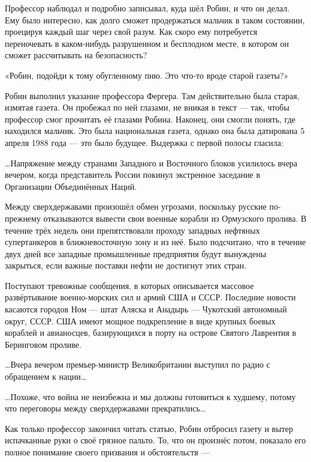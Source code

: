 \documentclass[a4paper,12pt]{book}
\begin{document}
\par
Профессор наблюдал и подробно записывал, куда шёл Робин, и что он делал. Ему было интересно, как долго сможет продержаться мальчик в таком состоянии, проецируя каждый шаг через свой разум. Как скоро ему потребуется переночевать в каком-нибудь разрушенном и бесплодном месте, в котором он сможет рассчитывать на безопасность?
\par
«Робин, подойди к тому обугленному пню. Это что-то вроде старой газеты?»
\par
Робин выполнил указание профессора Фергера. Там действительно была старая, измятая газета. Он пробежал по ней глазами, не вникая в текст — так, чтобы профессор смог прочитать её глазами Робина. Наконец, они смогли понять, где находился мальчик. Это была национальная газета, однако она была датирована 5 апреля 1988 года — это было будущее. Выдержка с первой полосы гласила:\\
\par
…Напряжение между странами Западного и Восточного блоков усилилось вчера вечером, когда представитель России покинул экстренное заседание в Организации Объединённых Наций.
\par
Между сверхдержавами произошёл обмен угрозами, поскольку русские по-прежнему отказываются вывести свои военные корабли из Ормузского пролива. В течение трёх недель они препятствовали проходу западных нефтяных супертанкеров в ближневосточную зону и из неё. Было подсчитано, что в течение двух дней все западные промышленные предприятия будут вынуждены закрыться, если важные поставки нефти не достигнут этих стран.
\par
Поступают тревожные сообщения, в которых описывается массовое развёртывание военно-морских сил и армий США и СССР. Последние новости касаются городов Ном — штат Аляска и Анадырь — Чукотский автономный округ, СССР. США имеют мощное подкрепление в виде крупных боевых кораблей и авианосцев, базирующихся в порту на острове Святого Лаврентия в Беринговом проливе.\\
\par
…Вчера вечером премьер-министр Великобритании выступил по радио с обращением к нации…\\
\par
…Похоже, что война не неизбежна и мы должны готовиться к худшему, потому что переговоры между сверхдержавами прекратились…\\
\par
Как только профессор закончил читать статью, Робин отбросил газету и вытер испачканные руки о своё грязное пальто. То, что он произнёс потом, показало его полное понимание своего призвания и обстоятельств —
\end{document}
